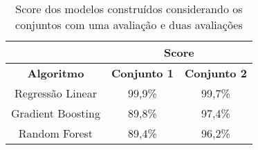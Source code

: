 \begin{table}[!htb]
    \centering
    \caption{Score dos modelos construídos considerando os conjuntos com uma avaliação e duas avaliações}
    \begin{tabular}{ccc}
        \textbf{} & \multicolumn{2}{c}{\textbf{Score}} \\ \hline
        \textbf{Algoritmo} & \textbf{Conjunto 1} & \textbf{Conjunto 2} \\
        Regressão Linear & 99,9\% & 99,7\% \\
        Gradient Boosting & 89,8\% & 97,4\% \\
        Random Forest & 89,4\% & 96,2\% \\ \hline
    \end{tabular}
    \label{tab:score-1}
\end{table}